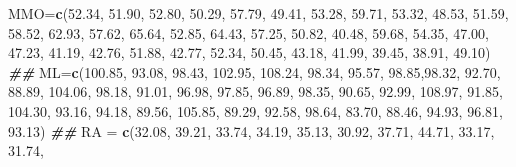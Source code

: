 \documentclass[
]{book}
\newenvironment{Shaded}{\begin{snugshade}}{\end{snugshade}}
\newcommand{\DocumentationTok}[1]{\textcolor[rgb]{0.56,0.35,0.01}{\textbf{\textit{#1}}}}
\newcommand{\FloatTok}[1]{\textcolor[rgb]{0.00,0.00,0.81}{#1}}
\newcommand{\FunctionTok}[1]{\textcolor[rgb]{0.13,0.29,0.53}{\textbf{#1}}}
\newcommand{\NormalTok}[1]{#1}
\newcommand{\OtherTok}[1]{\textcolor[rgb]{0.56,0.35,0.01}{#1}}
\begin{document}
\begin{Shaded}
\begin{Highlighting}[]
\NormalTok{MMO}\OtherTok{=}\FunctionTok{c}\NormalTok{(}\FloatTok{52.34}\NormalTok{, }\FloatTok{51.90}\NormalTok{, }\FloatTok{52.80}\NormalTok{, }\FloatTok{50.29}\NormalTok{, }\FloatTok{57.79}\NormalTok{, }\FloatTok{49.41}\NormalTok{, }\FloatTok{53.28}\NormalTok{, }\FloatTok{59.71}\NormalTok{, }\FloatTok{53.32}\NormalTok{, }\FloatTok{48.53}\NormalTok{, }
      \FloatTok{51.59}\NormalTok{, }\FloatTok{58.52}\NormalTok{, }\FloatTok{62.93}\NormalTok{, }\FloatTok{57.62}\NormalTok{, }\FloatTok{65.64}\NormalTok{, }\FloatTok{52.85}\NormalTok{, }\FloatTok{64.43}\NormalTok{, }\FloatTok{57.25}\NormalTok{, }\FloatTok{50.82}\NormalTok{, }\FloatTok{40.48}\NormalTok{, }
      \FloatTok{59.68}\NormalTok{, }\FloatTok{54.35}\NormalTok{, }\FloatTok{47.00}\NormalTok{, }\FloatTok{47.23}\NormalTok{, }\FloatTok{41.19}\NormalTok{, }\FloatTok{42.76}\NormalTok{, }\FloatTok{51.88}\NormalTok{, }\FloatTok{42.77}\NormalTok{, }\FloatTok{52.34}\NormalTok{, }\FloatTok{50.45}\NormalTok{, }
      \FloatTok{43.18}\NormalTok{, }\FloatTok{41.99}\NormalTok{, }\FloatTok{39.45}\NormalTok{, }\FloatTok{38.91}\NormalTok{, }\FloatTok{49.10}\NormalTok{)}
\DocumentationTok{\#\#}
\NormalTok{ML}\OtherTok{=}\FunctionTok{c}\NormalTok{(}\FloatTok{100.85}\NormalTok{, }\FloatTok{93.08}\NormalTok{, }\FloatTok{98.43}\NormalTok{, }\FloatTok{102.95}\NormalTok{, }\FloatTok{108.24}\NormalTok{, }\FloatTok{98.34}\NormalTok{, }\FloatTok{95.57}\NormalTok{, }\FloatTok{98.85}\NormalTok{,}\FloatTok{98.32}\NormalTok{, }\FloatTok{92.70}\NormalTok{, }
     \FloatTok{88.89}\NormalTok{, }\FloatTok{104.06}\NormalTok{, }\FloatTok{98.18}\NormalTok{, }\FloatTok{91.01}\NormalTok{, }\FloatTok{96.98}\NormalTok{, }\FloatTok{97.85}\NormalTok{, }\FloatTok{96.89}\NormalTok{, }\FloatTok{98.35}\NormalTok{, }\FloatTok{90.65}\NormalTok{, }\FloatTok{92.99}\NormalTok{, }
     \FloatTok{108.97}\NormalTok{, }\FloatTok{91.85}\NormalTok{, }\FloatTok{104.30}\NormalTok{, }\FloatTok{93.16}\NormalTok{, }\FloatTok{94.18}\NormalTok{, }\FloatTok{89.56}\NormalTok{, }\FloatTok{105.85}\NormalTok{, }\FloatTok{89.29}\NormalTok{, }\FloatTok{92.58}\NormalTok{, }\FloatTok{98.64}\NormalTok{, }
     \FloatTok{83.70}\NormalTok{, }\FloatTok{88.46}\NormalTok{, }\FloatTok{94.93}\NormalTok{, }\FloatTok{96.81}\NormalTok{, }\FloatTok{93.13}\NormalTok{)}
\DocumentationTok{\#\#}
\NormalTok{RA }\OtherTok{=} \FunctionTok{c}\NormalTok{(}\FloatTok{32.08}\NormalTok{, }\FloatTok{39.21}\NormalTok{, }\FloatTok{33.74}\NormalTok{, }\FloatTok{34.19}\NormalTok{, }\FloatTok{35.13}\NormalTok{, }\FloatTok{30.92}\NormalTok{, }\FloatTok{37.71}\NormalTok{, }\FloatTok{44.71}\NormalTok{, }\FloatTok{33.17}\NormalTok{, }\FloatTok{31.74}\NormalTok{, }

\end{Highlighting}
\end{Shaded}
\end{document}
